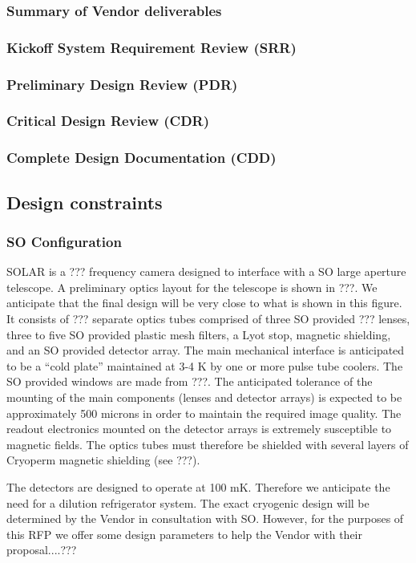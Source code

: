 \documentclass[12pt,letter]{article}
\begin{document}
    \subsubsection{Summary of Vendor deliverables}
    \subsubsection{Kickoff System Requirement Review (SRR)}
    \subsubsection{Preliminary Design Review (PDR)}
    \subsubsection{Critical Design Review (CDR)}
    \subsubsection{Complete Design Documentation (CDD)}
\subsection{Design constraints}   

    \subsubsection{SO Configuration}
    
    SOLAR is a ??? frequency camera designed to interface with a SO large aperture telescope. A preliminary optics layout for the telescope is shown in ???. We anticipate that the final design will be very close to what is shown in this figure. It consists of ??? separate optics tubes comprised of three SO provided ??? lenses, three to five SO provided plastic mesh filters, a Lyot stop, magnetic shielding, and an SO provided detector array. The main mechanical interface is anticipated to be a “cold plate” maintained at 3-4 K by one or more pulse tube coolers. The SO provided windows are made from ???. The anticipated tolerance of the mounting of the main components (lenses and detector arrays) is expected to be approximately 500 microns in order to maintain the required image quality. The readout electronics mounted on the detector arrays is extremely susceptible to magnetic fields. The optics tubes must therefore be shielded with several layers of Cryoperm magnetic shielding (see ???).
    
The detectors are designed to operate at 100 mK. Therefore we anticipate the need for a dilution refrigerator system. The exact cryogenic design will be determined by the Vendor in consultation with SO. However, for the purposes of this RFP we offer some design parameters to help the Vendor with their proposal....???
\end{document}
